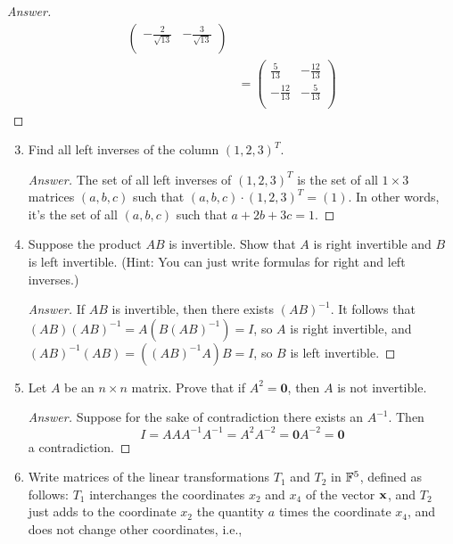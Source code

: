 \documentclass[../psets.tex]{subfiles}
\begin{document}
\begin{enumerate}[label={\textbf{5.\arabic*.}}]
\begin{proof}[Answer]
\begin{align*}
\begin{pmatrix}
                -\frac{2}{\sqrt{13}} & -\frac{3}{\sqrt{13}}\\
            \end{pmatrix}\\
            &=
            \begin{pmatrix}
                \frac{5}{13} & -\frac{12}{13}\\
                -\frac{12}{13} & -\frac{5}{13}\\
            \end{pmatrix}
        \end{align*}
        \endgroup
    \end{proof}
\end{enumerate}

\begin{enumerate}[label={\textbf{6.\arabic*.}}]
    \setcounter{enumi}{2}
    \item Find all left inverses of the column $(1,2,3)^T$.
    \begin{proof}[Answer]
        The set of all left inverses of $(1,2,3)^T$ is the set of all $1\times 3$ matrices $(a,b,c)$ such that $(a,b,c)\cdot(1,2,3)^T=(1)$. In other words, it's the set of all $(a,b,c)$ such that $a+2b+3c=1$.
    \end{proof}
    \setcounter{enumi}{5}
    \item Suppose the product $AB$ is invertible. Show that $A$ is right invertible and $B$ is left invertible. (Hint: You can just write formulas for right and left inverses.)
    \begin{proof}[Answer]
        If $AB$ is invertible, then there exists $(AB)^{-1}$. It follows that $(AB)(AB)^{-1}=A(B(AB)^{-1})=I$, so $A$ is right invertible, and $(AB)^{-1}(AB)=((AB)^{-1}A)B=I$, so $B$ is left invertible.
    \end{proof}
    \item Let $A$ be an $n\times n$ matrix. Prove that if $A^2=\bm{0}$, then $A$ is not invertible.
    \begin{proof}[Answer]
        Suppose for the sake of contradiction there exists an $A^{-1}$. Then
        \begin{equation*}
            I = AAA^{-1}A^{-1} = A^2A^{-2} = \bm{0}A^{-2} = \bm{0}
        \end{equation*}
        a contradiction.
    \end{proof}
    \item Write matrices of the linear transformations $T_1$ and $T_2$ in $\mathbb{F}^5$, defined as follows: $T_1$ interchanges the coordinates $x_2$ and $x_4$ of the vector $\mathbf{x}$, and $T_2$ just adds to the coordinate $x_2$ the quantity $a$ times the coordinate $x_4$, and does not change other coordinates, i.e.,

\end{enumerate}
\end{document}
